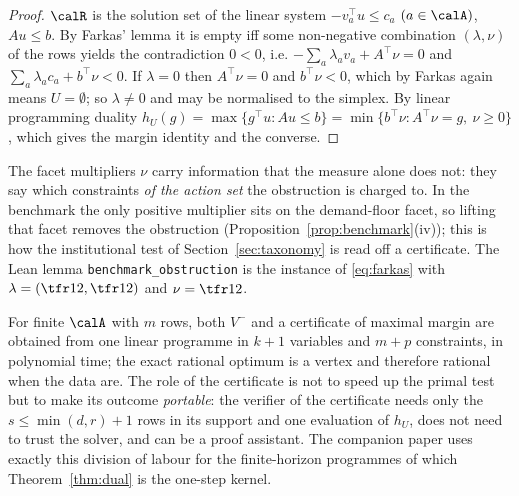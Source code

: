 \begin{proof}
$\calR$ is the solution set of the linear system $-v_a^\top u\le c_a$ $(a\in\calA)$, $Au\le b$. By Farkas' lemma \cite{Farkas1902,Chvatal1983} it is empty iff some non-negative combination $(\lambda,\nu)$ of the rows yields the contradiction $0<0$, i.e. $-\sum_a\lambda_av_a+A^\top\nu=0$ and $\sum_a\lambda_ac_a+b^\top\nu<0$. If $\lambda=0$ then $A^\top\nu=0$ and $b^\top\nu<0$, which by Farkas again means $U=\emptyset$; so $\lambda\neq0$ and may be normalised to the simplex. By linear programming duality $h_U(g)=\max\{g^\top u: Au\le b\}=\min\{b^\top\nu: A^\top\nu=g,\ \nu\ge0\}$, which gives the margin identity and the converse.
\end{proof}

The facet multipliers $\nu$ carry information that the measure alone does not: they say which constraints \emph{of the action set} the obstruction is charged to. In the benchmark the only positive multiplier sits on the demand-floor facet, so lifting that facet removes the obstruction (Proposition~\ref{prop:benchmark}(iv)); this is how the institutional test of Section~\ref{sec:taxonomy} is read off a certificate. The Lean lemma \texttt{benchmark\_obstruction} is the instance of \eqref{eq:farkas} with $\lambda=(\tfr12,\tfr12)$ and $\nu=\tfr12$.

\begin{remark}\label{rem:search}
For finite $\calA$ with $m$ rows, both $V^-$ and a certificate of maximal margin are obtained from one linear programme in $k+1$ variables and $m+p$ constraints, in polynomial time; the exact rational optimum is a vertex and therefore rational when the data are. The role of the certificate is not to speed up the primal test but to make its outcome \emph{portable}: the verifier of the certificate needs only the $s\le\min(d,r)+1$ rows in its support and one evaluation of $h_U$, does not need to trust the solver, and can be a proof assistant. The companion paper \cite{Abaee2026cert} uses exactly this division of labour for the finite-horizon programmes of which Theorem~\ref{thm:dual} is the one-step kernel.
\end{remark}
